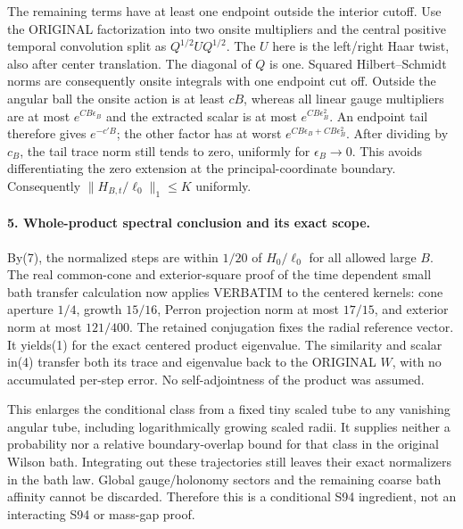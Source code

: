 \documentclass[11pt]{article}
\begin{document}
The remaining terms have at least one endpoint outside the interior cutoff.
Use the ORIGINAL factorization into two onsite multipliers and the central
positive temporal convolution split as $Q^{1/2}UQ^{1/2}$. The $U$ here is the
left/right Haar twist, also after center translation. The diagonal of $Q$ is
one. Squared Hilbert--Schmidt norms are consequently onsite integrals with
one endpoint cut off. Outside the angular ball the onsite action is at least
$cB$, whereas all linear gauge multipliers are at most $e^{CB\epsilon_B}$
and the extracted scalar is at most $e^{CB\epsilon_B^2}$. An endpoint tail
therefore gives $e^{-c'B}$; the other factor has at worst
$e^{CB\epsilon_B+CB\epsilon_B^2}$. After dividing by $c_B$, the tail trace norm
still tends to zero, uniformly for $\epsilon_B\to0$. This avoids differentiating
the zero extension at the principal-coordinate boundary. Consequently
$\|H_{B,t}/\ell_0\|_1\le K$ uniformly.

\paragraph{5. Whole-product spectral conclusion and its exact scope.}
By(7), the normalized steps are within $1/20$ of $H_0/\ell_0$ for all allowed
large $B$. The real common-cone and exterior-square proof of the time dependent small bath transfer calculation now applies
VERBATIM to the centered kernels: cone aperture $1/4$, growth $15/16$,
Perron projection norm at most $17/15$, and exterior norm at most $121/400$.
The retained conjugation fixes the radial reference vector. It yields(1) for
the exact centered product eigenvalue. The similarity and scalar in(4) transfer
both its trace and eigenvalue back to the ORIGINAL $W$, with no accumulated
per-step error. No self-adjointness of the product was assumed.

This enlarges the conditional class from a fixed tiny scaled tube to any
vanishing angular tube, including logarithmically growing scaled radii.
It supplies neither a probability nor a relative boundary-overlap bound for
that class in the original Wilson bath. Integrating out these trajectories
still leaves their exact normalizers in the bath law. Global gauge/holonomy
sectors and the remaining coarse bath affinity cannot be discarded. Therefore
this is a conditional S94 ingredient, not an interacting S94 or mass-gap proof.
\end{document}
